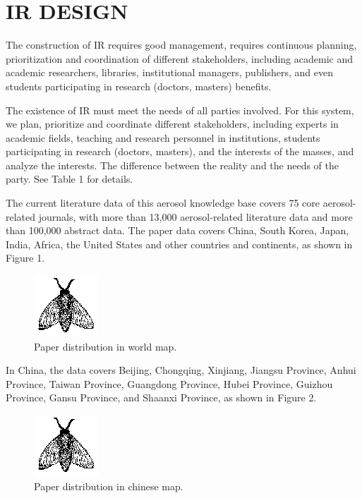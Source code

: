 \section{IR DESIGN}
The construction of IR requires good management, requires continuous planning, prioritization and coordination of different stakeholders, including academic and academic researchers, libraries, institutional managers, publishers, and even students participating in research (doctors, masters) benefits.

The existence of IR must meet the needs of all parties involved. For this system, we plan, prioritize and coordinate different stakeholders, including experts in academic fields, teaching and research personnel in institutions, students participating in research (doctors, masters), and the interests of the masses, and analyze the interests. The difference between the reality and the needs of the party. See Table 1 for details.

The current literature data of this aerosol knowledge base covers 75 core aerosol-related journals, with more than 13,000 aerosol-related literature data and more than 100,000 abstract data. The paper data covers China, South Korea, Japan, India, Africa, the United States and other countries and continents, as shown in Figure 1.

\begin{figure}
	\includegraphics{fly}
	\caption{Paper distribution in world map.}
\end{figure}

In China, the data covers Beijing, Chongqing, Xinjiang, Jiangsu Province, Anhui Province, Taiwan Province, Guangdong Province, Hubei Province, Guizhou Province, Gansu Province, and Shaanxi Province, as shown in Figure 2.

\begin{figure}
	\includegraphics{fly}
	\caption{Paper distribution in chinese map.}
\end{figure}



